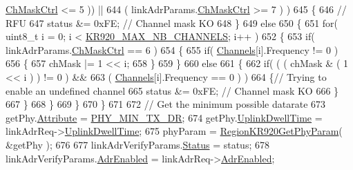 \begin{DoxyCode}
      \mbox{\hyperlink{structs_region_common_link_adr_params_ac5e1891f30a172b2ce39bc3498e1843d}{ChMaskCtrl}} <= 5 )) ||
644                 ( linkAdrParams.\mbox{\hyperlink{structs_region_common_link_adr_params_ac5e1891f30a172b2ce39bc3498e1843d}{ChMaskCtrl}} >= 7 ) )
645         \{
646             \textcolor{comment}{// RFU}
647             status &= 0xFE; \textcolor{comment}{// Channel mask KO}
648         \}
649         \textcolor{keywordflow}{else}
650         \{
651             \textcolor{keywordflow}{for}( uint8\_t i = 0; i < \mbox{\hyperlink{group___r_e_g_i_o_n_k_r920_ga28705c59a2c19a1de8b22d294fc6bebb}{KR920\_MAX\_NB\_CHANNELS}}; i++ )
652             \{
653                 \textcolor{keywordflow}{if}( linkAdrParams.\mbox{\hyperlink{structs_region_common_link_adr_params_ac5e1891f30a172b2ce39bc3498e1843d}{ChMaskCtrl}} == 6 )
654                 \{
655                     \textcolor{keywordflow}{if}( \mbox{\hyperlink{_region_k_r920_8c_aa22cc2ed5f1e155ccf4f0c0388da513e}{Channels}}[i].Frequency != 0 )
656                     \{
657                         chMask |= 1 << i;
658                     \}
659                 \}
660                 \textcolor{keywordflow}{else}
661                 \{
662                     \textcolor{keywordflow}{if}( ( ( chMask & ( 1 << i ) ) != 0 ) &&
663                         ( \mbox{\hyperlink{_region_k_r920_8c_aa22cc2ed5f1e155ccf4f0c0388da513e}{Channels}}[i].Frequency == 0 ) )
664                     \{\textcolor{comment}{// Trying to enable an undefined channel}
665                         status &= 0xFE; \textcolor{comment}{// Channel mask KO}
666                     \}
667                 \}
668             \}
669         \}
670     \}
671 
672     \textcolor{comment}{// Get the minimum possible datarate}
673     getPhy.\mbox{\hyperlink{structs_get_phy_params_abdcb168ffd6913b85e2f635d7a475f2d}{Attribute}} = \mbox{\hyperlink{group___r_e_g_i_o_n_gga51cbe8f5433d914fe9cf81b451de2c2daace3e56c88b40def8ed6a9106871e7de}{PHY\_MIN\_TX\_DR}};
674     getPhy.\mbox{\hyperlink{structs_get_phy_params_a0e6663762d6f9173bc8d8cb018f8f17a}{UplinkDwellTime}} = linkAdrReq->\mbox{\hyperlink{structs_link_adr_req_params_a0e6663762d6f9173bc8d8cb018f8f17a}{UplinkDwellTime}};
675     phyParam = \mbox{\hyperlink{group___r_e_g_i_o_n_k_r920_ga108b8547f585d92dd1198c18fc262fa2}{RegionKR920GetPhyParam}}( &getPhy );
676 
677     linkAdrVerifyParams.\mbox{\hyperlink{structs_region_common_link_adr_req_verify_params_a7ca418fa247ab5f1df4e8b5852d8b738}{Status}} = status;
678     linkAdrVerifyParams.\mbox{\hyperlink{structs_region_common_link_adr_req_verify_params_ab3e2fb44577c95786e11aacd56769703}{AdrEnabled}} = linkAdrReq->\mbox{\hyperlink{structs_link_adr_req_params_ab3e2fb44577c95786e11aacd56769703}{AdrEnabled}};

\end{DoxyCode}
